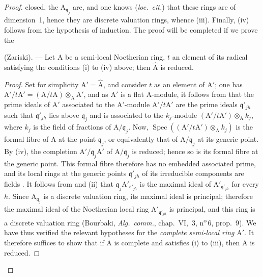 \begin{proof}

closed, the $\mathrm{A}_{\mathfrak{q}_j}$ are, and one knows (\emph{loc.\ cit.}) that these rings are of dimension~1, hence they are discrete valuation rings, whence (iii). Finally, (iv) follows from the hypothesis of induction. The proof will be completed if we prove the

\begin{lemma}[7.6.4.1]
\label{IV.7.6.4.1}
(Zariski). --- Let $\mathrm{A}$ be a semi-local Noetherian ring, $t$ an element of its radical satisfying the conditions (i) to (iv) above; then $\widehat{\mathrm{A}}$ is reduced.
\end{lemma}

\begin{proof}
\renewcommand{\qedsymbol}{\openbox}
Set for simplicity $\mathrm{A}'=\widehat{\mathrm{A}}$, and consider $t$ as an element of $\mathrm{A}'$; one has $\mathrm{A}'/t\mathrm{A}'=(\mathrm{A}/t\mathrm{A})\otimes_\mathrm{A}\mathrm{A}'$, and as $\mathrm{A}'$ is a flat $\mathrm{A}$-module, it follows from  that the prime ideals of $\mathrm{A}'$ associated to the $\mathrm{A}'$-module $\mathrm{A}'/t\mathrm{A}'$ are the prime ideals $\mathfrak{q}'_{jh}$ such that $\mathfrak{q}'_{jh}$ lies above $\mathfrak{q}_j$ and is associated to the $k_j$-module $(\mathrm{A}'/t\mathrm{A}')\otimes_\mathrm{A} k_j$, where $k_j$ is the field of fractions of $\mathrm{A}/\mathfrak{q}_j$. Now, $\operatorname{Spec}((\mathrm{A}'/t\mathrm{A}')\otimes_\mathrm{A} k_j)$ is the formal fibre of $\mathrm{A}$ at the point $\mathfrak{q}_j$, or equivalently that of $\mathrm{A}/\mathfrak{q}_j$ at its generic point. By (iv), the completion $\mathrm{A}'/\mathfrak{q}_j\mathrm{A}'$ of $\mathrm{A}/\mathfrak{q}_j$ is reduced; hence so is its formal fibre at the generic point. This formal fibre therefore has no embedded associated prime, and its local rings at the generic points $\mathfrak{q}'_{jh}$ of its irreducible components are fields . It follows from  and (ii) that $\mathfrak{q}_j\mathrm{A}'_{\mathfrak{q}'_{jh}}$ is the maximal ideal of $\mathrm{A}'_{\mathfrak{q}'_{jh}}$ for every $h$. Since $\mathrm{A}_{\mathfrak{q}_j}$ is a discrete valuation ring, its maximal ideal is principal; therefore the maximal ideal of the Noetherian local ring $\mathrm{A}'_{\mathfrak{q}'_{jh}}$ is principal, and this ring is a discrete valuation ring (Bourbaki, \emph{Alg.\ comm.}, chap.~VI, \textsection\,3, n\textsuperscript{o}\,6, prop.~9). We have thus verified the relevant hypotheses for the \emph{complete semi-local ring} $\mathrm{A}'$. It therefore suffices to show that if $\mathrm{A}$ is complete and satisfies (i) to (iii), then $\mathrm{A}$ is reduced.


\end{proof}
\end{proof}
